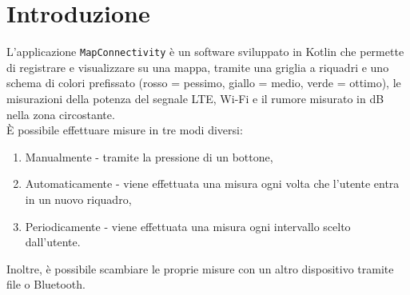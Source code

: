 \documentclass[11pt]{article}
\begin{document}
\section{Introduzione}
L'applicazione \texttt{MapConnectivity} è un software sviluppato in Kotlin che permette di registrare e visualizzare su una mappa, tramite una griglia a riquadri e uno schema di colori prefissato (rosso = pessimo, giallo = medio, verde = ottimo), le misurazioni della potenza del segnale LTE, Wi-Fi e il rumore misurato in dB nella zona circostante. \\
È possibile effettuare misure in tre modi diversi:
\begin{enumerate}
    \item Manualmente - tramite la pressione di un bottone,
    \item Automaticamente - viene effettuata una misura ogni volta che l'utente entra in un nuovo riquadro,
    \item Periodicamente - viene effettuata una misura ogni intervallo scelto dall'utente.
\end{enumerate}
Inoltre, è possibile scambiare le proprie misure con un altro dispositivo tramite file o Bluetooth.
\end{document}
